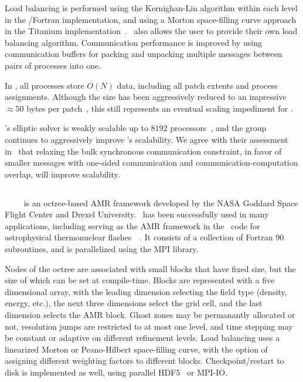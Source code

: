 \documentclass[10pt,twocolumn]{article}
\begin{document}
Load balancing is performed using the Kernighan-Lin algorithm within
each level in the \cpp/Fortran implementation, and using a Morton
space-filling curve approach in the Titanium
implementation~\cite{WeSu07}.  \chombo\ also allows the user to
provide their own load balancing algorithm.  Communication performance
is improved by using communication buffers for packing and unpacking
multiple messages between pairs of processes into one.

In \chombo, all processes store $O(N)$
data, including all patch extents and process assignments.  Although
the size has been aggressively reduced to an impressive $\approx 50$
bytes per patch~\cite{CoKe07}, this still represents an eventual
scaling impediment for \chombo.

\chombo's elliptic solver is weakly scalable up to $8192$
processors~\cite{WeSu07}, and the group continues to aggressively
improve \chombo's scalability.  We agree with their assessment
in~\cite{WeSu07} that relaxing the bulk synchronous communication
constraint, in favor of smaller messages with one-sided communication
and communication-computation overlap, will improve scalability.

\subsection{\paramesh} \label{ss:paramesh}

\paramesh~\cite{MaOl00}~\cite{OlMa05}~\cite{Ol06}~\cite{wwwparamesh}
is an octree-based AMR framework developed by the NASA Goddard Space
Flight Center and Drexel University.  \paramesh\ has been successfully
used in many applications, including serving as the AMR framework in
the \flash\ code for astrophysical thermonuclear
flashes~\cite{FrOl00}~\cite{wwwflash}.  It consists of a collection of
Fortran 90 subroutines, and is parallelized using the MPI library.

Nodes of the octree are associated with small blocks that have fixed
size, but the size of which can be set at compile-time.  Blocks are
represented with a five dimensional array, with the leading dimension
selecting the field type (density, energy, etc.), the next three
dimensions select the grid cell, and the last dimension selects the
AMR block.  Ghost zones may be permanantly allocated or not,
resolution jumps are restricted to at most one level, and time
stepping may be constant or adaptive on different refinement levels.
Load balancing uses a linearized Morton or Peano-Hilbert space-filling
curve, with the option of assigning different weighting factors to
different blocks.  Checkpoint/restart to disk is implemented as well,
using parallel HDF5~\cite{hdf5} or MPI-IO.
\end{document}
